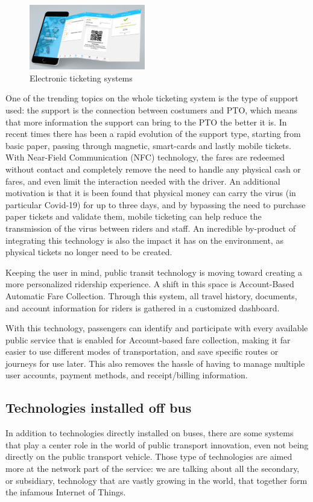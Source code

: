 \begin{figure}[h!]
    \centering
    \includegraphics[width=0.45\textwidth]{Images/New Technologies/ELECTRONIC TICKET.png}
    \caption{Electronic ticketing systems\cite{eticketimage}}
    \label{fig:ets}
\end{figure}

One of the trending topics on the whole ticketing system is the type of support used: the support is the connection between costumers and PTO, which means that more information the support can bring to the PTO the better it is. In recent times there has been a rapid evolution of the support type, starting from basic paper, passing through magnetic, smart-cards and lastly mobile tickets. With Near-Field Communication (NFC) technology, the fares are redeemed without contact and completely remove the need to handle any physical cash or fares, and even limit the interaction needed with the driver. An additional motivation is that it is been found that physical money can carry the virus (in particular Covid-19) for up to three days, and by bypassing the need to purchase paper tickets and validate them, mobile ticketing can help reduce the transmission of the virus between riders and staff. An incredible by-product of integrating this technology is also the impact it has on the environment, as physical tickets no longer need to be created.

Keeping the user in mind, public transit technology is moving toward creating a more personalized ridership experience. A shift in this space is Account-Based Automatic Fare Collection. Through this system, all travel history, documents, and account information for riders is gathered in a customized dashboard.

With this technology, passengers can identify and participate with every available public service that is enabled for Account-based fare collection, making it far easier to use different modes of transportation, and save specific routes or journeys for use later. This also removes the hassle of having to manage multiple user accounts, payment methods, and receipt/billing information.

\subsection{Technologies installed off bus}
\label{subsec:techoffbus}
In addition to technologies directly installed on buses, there are some systems that play a center role in the world of public transport innovation, even not being directly on the public transport vehicle. Those type of technologies are aimed more at the network part of the service: we are talking about all the secondary, or subsidiary, technology that are vastly growing in the world, that together form the infamous Internet of Things. 

